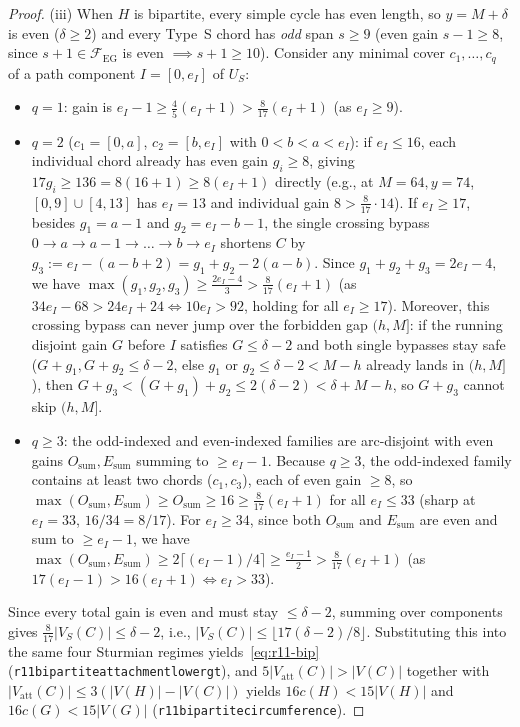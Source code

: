 \documentclass[11pt,reqno]{amsart}
\theoremstyle{plain}
\theoremstyle{definition}
\theoremstyle{remark}
\newcommand{\FEG}{\mathcal{F}_{\mathrm{EG}}}
\newcommand{\Vatt}{V_{\mathrm{att}}}
\DeclareRobustCommand{\_}{\ifmmode\text{\textunderscore}\else\textunderscore\allowbreak\fi}
\begin{document}
\begin{proof}
(iii) When $H$ is bipartite, every simple cycle has even length, so $y = M + \delta$ is even ($\delta \ge 2$) and every Type~S chord has \emph{odd} span $s \ge 9$ (even gain $s - 1 \ge 8$, since $s + 1 \in \FEG$ is even $\implies s + 1 \ge 10$). Consider any minimal cover $c_1, \dots, c_q$ of a path component $I = [0, e_I]$ of $U_S$:
\begin{itemize}[leftmargin=1.6em]
  \item $q = 1$: gain is $e_I - 1 \ge \frac{4}{5}(e_I + 1) > \frac{8}{17}(e_I + 1)$ (as $e_I \ge 9$).
  \item $q = 2$ ($c_1 = [0, a]$, $c_2 = [b, e_I]$ with $0 < b < a < e_I$): if $e_I \le 16$, each individual chord already has even gain $g_i \ge 8$, giving $17 g_i \ge 136 = 8(16 + 1) \ge 8(e_I + 1)$ directly (e.g., at $M = 64, y = 74$, $[0, 9] \cup [4, 13]$ has $e_I = 13$ and individual gain $8 > \frac{8}{17}\cdot 14$). If $e_I \ge 17$, besides $g_1 = a - 1$ and $g_2 = e_I - b - 1$, the single crossing bypass $0 \to a \to a - 1 \to \dots \to b \to e_I$ shortens $C$ by $g_3 := e_I - (a - b + 2) = g_1 + g_2 - 2(a - b)$. Since $g_1 + g_2 + g_3 = 2 e_I - 4$, we have $\max(g_1, g_2, g_3) \ge \frac{2 e_I - 4}{3} > \frac{8}{17}(e_I + 1)$ (as $34 e_I - 68 > 24 e_I + 24 \iff 10 e_I > 92$, holding for all $e_I \ge 17$). Moreover, this crossing bypass can never jump over the forbidden gap $(h, M]$: if the running disjoint gain $G$ before $I$ satisfies $G \le \delta - 2$ and both single bypasses stay safe ($G + g_1, G + g_2 \le \delta - 2$, else $g_1$ or $g_2 \le \delta - 2 < M - h$ already lands in $(h, M]$), then $G + g_3 < (G + g_1) + g_2 \le 2(\delta - 2) < \delta + M - h$, so $G + g_3$ cannot skip $(h, M]$.
  \item $q \ge 3$: the odd-indexed and even-indexed families are arc-disjoint with even gains $O_{\mathrm{sum}}, E_{\mathrm{sum}}$ summing to $\ge e_I - 1$. Because $q \ge 3$, the odd-indexed family contains at least two chords ($c_1, c_3$), each of even gain $\ge 8$, so $\max(O_{\mathrm{sum}}, E_{\mathrm{sum}}) \ge O_{\mathrm{sum}} \ge 16 \ge \frac{8}{17}(e_I + 1)$ for all $e_I \le 33$ (sharp at $e_I = 33$, $16/34 = 8/17$). For $e_I \ge 34$, since both $O_{\mathrm{sum}}$ and $E_{\mathrm{sum}}$ are even and sum to $\ge e_I - 1$, we have $\max(O_{\mathrm{sum}}, E_{\mathrm{sum}}) \ge 2\lceil (e_I - 1)/4 \rceil \ge \frac{e_I - 1}{2} > \frac{8}{17}(e_I + 1)$ (as $17(e_I - 1) > 16(e_I + 1) \iff e_I > 33$).
\end{itemize}
Since every total gain is even and must stay $\le \delta - 2$, summing over components gives $\frac{8}{17}|V_S(C)| \le \delta - 2$, i.e., $|V_S(C)| \le \lfloor 17(\delta - 2)/8 \rfloor$. Substituting this into the same four Sturmian regimes yields~\eqref{eq:r11-bip} (\texttt{r11\_bipartite\_attachment\_lower\_gt\_1\_5}), and $5 |\Vatt(C)| > |V(C)|$ together with $|\Vatt(C)| \le 3(|V(H)| - |V(C)|)$ yields $16 c(H) < 15 |V(H)|$ and $16 c(G) < 15 |V(G)|$ (\texttt{r11\_bipartite\_circumference\_15\_16}).
\end{proof}
\end{document}

